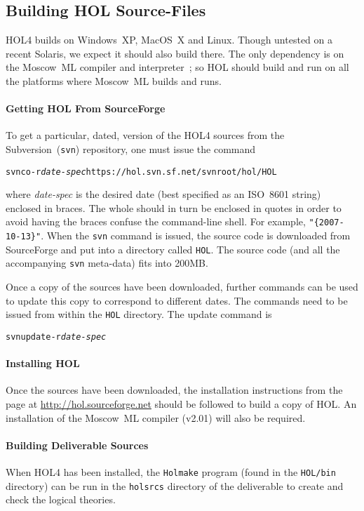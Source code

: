 \documentclass[11pt]{article}
\begin{document}
\subsection{Building HOL Source-Files}
\label{sec:getting-hol}

HOL4 builds on Windows~XP, MacOS~X and Linux.  Though untested on a
recent Solaris, we expect it should also build there.  The only
dependency is on the Moscow~ML compiler and interpreter~\cite{mosml};
so HOL should build and run on all the platforms where Moscow~ML
builds and runs.

\paragraph{Getting HOL From SourceForge}

To get a particular, dated, version of the HOL4 sources from the
Subversion~(\texttt{svn}) repository, one must issue the command
\begin{alltt}
   svn co -r \textit{date-spec} https://hol.svn.sf.net/svnroot/hol/HOL
\end{alltt}
where \textit{\ttfamily date-spec} is the desired date (best specified
as an ISO~8601 string) enclosed in braces.  The whole should in turn
be enclosed in quotes in order to avoid having the braces confuse the
command-line shell.  For example, \texttt{"\{2007-10-13\}"}.  When the
\texttt{svn} command is issued, the source code is downloaded from
SourceForge and put into a directory called \texttt{HOL}.  The source
code (and all the accompanying \texttt{svn} meta-data) fits into
200MB.

Once a copy of the sources have been downloaded, further commands can
be used to update this copy to correspond to different dates.  The
commands need to be issued from within the \texttt{HOL} directory.
The update command is
\begin{alltt}
   svn update -r \textit{date-spec}
\end{alltt}

\paragraph{Installing HOL} Once the sources have been downloaded, the
installation instructions from the page at
\url{http://hol.sourceforge.net} should be followed to build a copy of
HOL.  An installation of the Moscow~ML compiler (v2.01) will also be
required.

\paragraph{Building Deliverable Sources}
When HOL4 has been installed, the \texttt{Holmake} program (found in
the \texttt{HOL/bin} directory) can be run in the \texttt{holsrcs}
directory of the \cpp{} deliverable to create and check the logical
theories.

\nocite{Stroustrup1994:DECPP,Stroustrup2000:TCPL,Paulson:ML,Gordon93}
\nocite{Rushby93}
\newpage



\printindex
\end{document}
